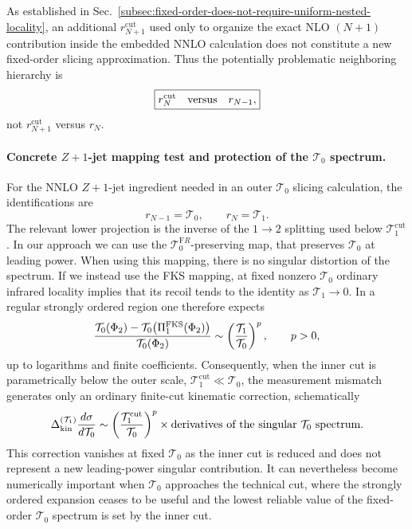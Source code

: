 \documentclass[11pt]{article}
\newcommand{\rnm}{r_{N-1}}
\newcommand{\rn}{r_N}
\newcommand{\rnp}{r_{N+1}}
\newcommand{\cut}{\mathrm{cut}}
\newcommand{\Ph}{\Phi}
\begin{document}
As established in Sec.~\ref{subsec:fixed-order-does-not-require-uniform-nested-locality}, an additional
$\rnp^{\cut}$ used only to organize the exact NLO $(N+1)$ contribution inside the embedded NNLO calculation
does not constitute a new fixed-order slicing approximation. Thus the potentially problematic neighboring
hierarchy is
\begin{equation}
\boxed{
\rn^{\cut}\quad\hbox{versus}\quad \rnm,
}
\label{eq:relevant-inner-outer-hierarchy}
\end{equation}
not $\rnp^{\cut}$ versus $\rn$.

\paragraph{Concrete $Z+1$-jet mapping test and protection of the $\mathcal T_0$ spectrum.}
For the NNLO $Z+1$-jet ingredient needed in an outer $\mathcal T_0$ slicing calculation, the identifications
are
\begin{equation}
\rnm=\mathcal T_0,
\qquad
\rn=\mathcal T_1.
\label{eq:z1j-embedded-identification}
\end{equation}
The relevant lower projection is the inverse of the $1\to2$ splitting used below
$\mathcal T_1^{\cut}$.  
In our approach we can use the $\mathcal T_0^{\mathrm FR}$-preserving map, that preserves $\mathcal T_0$ at leading power. When using this mapping, there is no singular distortion of the spectrum.
If we instead use the FKS mapping,
at fixed nonzero $\mathcal T_0$ ordinary infrared locality 
implies that its recoil tends to the identity as $\mathcal T_1\to0$. In a regular strongly ordered region one
therefore expects
\begin{equation}
\frac{
\mathcal T_0(\Ph_2)
-
\mathcal T_0\!\left(\Pi_1^{\rm FKS}(\Ph_2)\right)
}{\mathcal T_0(\Ph_2)}
\sim
\left(\frac{\mathcal T_1}{\mathcal T_0}\right)^p,
\qquad p>0,
\label{eq:z1j-fks-t0-migration-scaling}
\end{equation}
up to logarithms and finite coefficients. Consequently, when the inner cut is parametrically below the
outer scale, $\mathcal T_1^{\cut}\ll\mathcal T_0$, the measurement mismatch generates only an ordinary
finite-cut kinematic correction, schematically
\begin{equation}
\Delta_{\rm kin}^{(\mathcal T_1)}
\frac{d\sigma}{d\mathcal T_0}
\sim
\left(\frac{\mathcal T_1^{\cut}}{\mathcal T_0}\right)^p
\times
\hbox{derivatives of the singular $\mathcal T_0$ spectrum}.
\label{eq:z1j-fks-t0-cut-scaling}
\end{equation}
This correction vanishes at fixed $\mathcal T_0$ as the inner cut is reduced and does not represent a new
leading-power singular contribution. It can nevertheless become numerically important when
$\mathcal T_0$ approaches the technical cut, where the strongly ordered expansion ceases to be useful and
the lowest reliable value of the fixed-order $\mathcal T_0$ spectrum is set by the inner cut.
\end{document}
